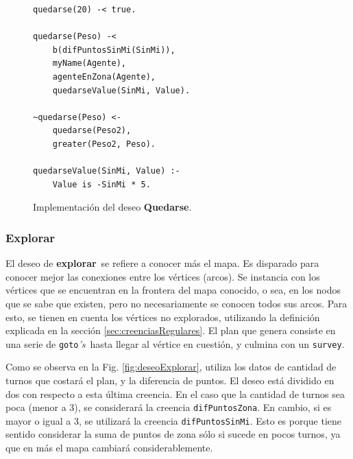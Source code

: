 \documentclass[oneside]{book}
\theoremstyle{definition}
\theoremstyle{example}
\begin{document}
\begin{figure}
\begin{verbatim}
quedarse(20) -< true.

quedarse(Peso) -< 
    b(difPuntosSinMi(SinMi)),
    myName(Agente),
    agenteEnZona(Agente),
    quedarseValue(SinMi, Value).

~quedarse(Peso) <-
    quedarse(Peso2),
    greater(Peso2, Peso).

quedarseValue(SinMi, Value) :-   
    Value is -SinMi * 5.
\end{verbatim}
\caption{Implementación del deseo \textbf{Quedarse}.}
\label{fig:deseoQuedarse}
\end{figure}


\subsubsection{Explorar}

El deseo de \textbf{explorar}\ se refiere a conocer más el mapa. Es disparado para 
conocer mejor las conexiones entre los vértices (arcos). Se instancia con los vértices
que se encuentran en la frontera del mapa conocido, o sea, en los nodos que se sabe
que existen, pero no necesariamente se conocen todos sus arcos. Para esto, se tienen en 
cuenta los vértices no explorados, utilizando la definición explicada en la 
sección \ref{sec:creenciasRegulares}. El plan que genera 
consiste en una serie de \texttt{goto}\textit{'s}\ hasta llegar al vértice en cuestión, y 
culmina con un \texttt{survey}.



Como se observa en la Fig. \ref{fig:deseoExplorar}, utiliza los datos de cantidad de 
turnos que costará el plan, y la diferencia de puntos.
El deseo está dividido en dos con respecto a esta última creencia. En el caso que la
cantidad de turnos sea poca (menor a 3), se considerará la creencia 
\texttt{difPuntosZona}. En cambio, si es mayor o igual a 3, se utilizará la creencia
\texttt{difPuntosSinMi}. Esto es porque tiene sentido considerar la suma de puntos
de zona sólo si sucede en pocos turnos, ya que en más el mapa cambiará 
considerablemente. 
\end{document}
